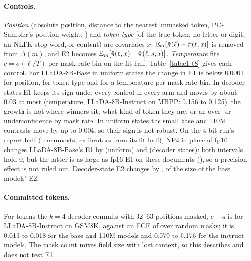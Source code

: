 \paragraph{Controls.}
\emph{Position} (absolute position, distance to the nearest unmasked token,
PC-Sampler's position weight; \citealp{huang2025pcsampler}) and \emph{token type} (of the true
token: no letter or digit, an NLTK stop-word, or content) are covariates $x$: $\mathbb{E}_m[\hat\pi(\ell)-\hat\pi(\ell,x)]$
is removed from $\Delta(m)$, and E2 becomes $\mathbb{E}_m[\hat\pi(\ell,x)-\hat\pi(\ell,s,x)]$. \emph{Temperature}
fits $c=\sigma(\ell/T)$ per mask-rate bin on the fit half.
Table~\ref{tab:c1-t8} gives each control. For LLaDA-8B-Base in uniform states the change in E1
is below $0.0001$ for position,
 for token type and
 for a temperature per mask-rate bin.
In decoder states E1 keeps its sign under every control in every arm and moves by about
0.03 at most (temperature, LLaDA-8B-Instruct on MBPP: 0.156 to 0.125): the growth is not where
winners sit, what kind of token they are, or an over- or underconfidence by mask rate. In
uniform states the small base and 110M contrasts move by up to 0.004, so their sign is not
robust.
On the 4-bit run's report half (\VivaLladaBaseFourBitDocs{} documents, calibrators from its fit
half), NF4 in place of fp16 changes LLaDA-8B-Base's E1 by
 (uniform) and
 (decoder states):
both intervals hold 0, but the latter is as large as fp16 E1 on these documents
(), so a precision effect
is not ruled out. Decoder-state E2 changes by
, of the size of the
base models' E2.

\paragraph{Committed tokens.}
\label{sec:c1-app-native}
For tokens the $k{=}4$ decoder commits with 32--63 positions masked, $c-a$ is
 for LLaDA-8B-Instruct on GSM8K,
against an ECE of  over random masks; it is 0.013 to 0.018 for
the base and 110M models and 0.079 to 0.176 for the instruct models. The mask count mixes field size
with lost context, so this describes and does not test E1.

